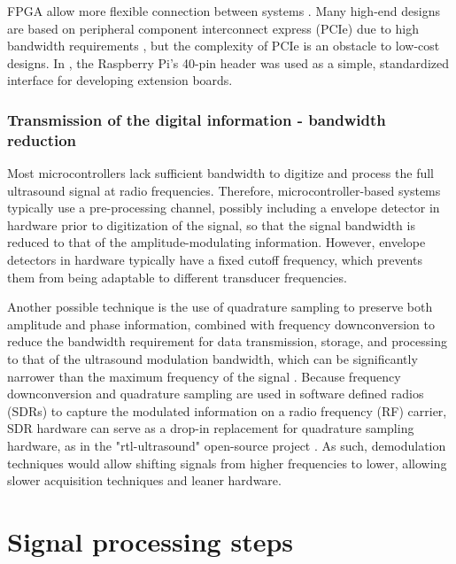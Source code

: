 \documentclass{article}
\begin{document}
FPGA allow more flexible connection between systems \cite{gilliland_architecture_2016,govindan_hwsw_2013}. Many high-end designs are based on peripheral component interconnect express (PCIe) due to high bandwidth requirements \cite{zimmermann_high_2018, lewandowski_low-cost_2012, kidav_architecture_2019}, but the complexity of PCIe is an obstacle to low-cost designs. In \cite{luc_jonveaux_un0rick_2019}, the Raspberry Pi's 40-pin header was used as a simple, standardized interface for developing extension boards. 

\subsubsection{Transmission of the digital information - bandwidth reduction}

Most microcontrollers lack sufficient bandwidth to digitize and process the full ultrasound signal at radio frequencies. Therefore, microcontroller-based systems typically use a pre-processing channel, possibly including a envelope detector in hardware prior to digitization of the signal, so that the signal bandwidth is reduced to that of the amplitude-modulating information. However, envelope detectors in hardware typically have a fixed cutoff frequency, which prevents them from being adaptable to different transducer frequencies.

Another possible technique is the use of quadrature sampling to preserve both amplitude and phase information, combined with frequency downconversion to reduce the bandwidth requirement for data transmission, storage, and processing to that of the ultrasound modulation bandwidth, which can be significantly narrower than the maximum frequency of the signal \cite{peyton_comparison_2018}. Because frequency downconversion and quadrature sampling are used in software defined radios (SDRs) \cite{hager_design_2019, hager_lightprobe:_2019} to capture the modulated information on a radio frequency (RF) carrier, SDR hardware can serve as a drop-in replacement for quadrature sampling hardware, as in the "rtl-ultrasound" open-source project \cite{meng_rtl-ultrasound_2019}.  As such, demodulation techniques would allow shifting signals from higher frequencies to lower, allowing slower acquisition techniques and leaner hardware. 




\newpage

\section{Signal processing steps}
\end{document}
